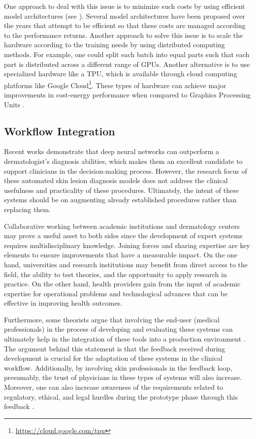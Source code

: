     One approach to deal with this issue is to minimize such costs by using efficient model architectures (see ). Several model architectures have been proposed over the years that attempt to be efficient so that these costs are managed according to the performance returns. Another approach to solve this issue is to scale the hardware according to the training needs by using distributed computing methods. For example, one could split each batch into equal parts such that each part is distributed across a different range of \ac{GPU}s. Another alternative is to use specialized hardware like a \ac{TPU}, which is available through cloud computing platforms like Google Cloud\footnote{\url{https://cloud.google.com/tpu}}. These types of hardware can achieve major improvements in cost-energy performance when compared to Graphics Processing Units \cite{Alom2019}. \par
    
    \subsection{Workflow Integration}
    Recent works \cite{Haenssle2018}\cite{Esteva2017}\cite{humanvsisic2018} demonstrate that deep neural networks can outperform a dermatologist's diagnosis abilities, which makes them an excellent candidate to support clinicians in the decision-making process. However, the research focus of these automated skin lesion diagnosis models does not address the clinical usefulness and practicality of these procedures. Ultimately, the intent of these systems should be on augmenting already established procedures rather than replacing them. \par 
    
    Collaborative working between academic institutions and dermatology centers may prove a useful asset to both sides since the development of expert systems requires multidisciplinary knowledge. Joining forces and sharing expertise are key elements to ensure improvements that have a measurable impact. On the one hand, universities and research institutions may benefit from direct access to the field, the ability to test theories, and the opportunity to apply research in practice. On the other hand, health providers gain from the input of academic expertise for operational problems and technological advances that can be effective in improving health outcomes. \par
    
    Furthermore, some theorists argue that involving the end-user (medical professionals) in the process of developing and evaluating these systems can ultimately help in the integration of these tools into a production environment \cite{Ching2018}. The argument behind this statement is that the feedback received during development is crucial for the adaptation of these systems in the clinical workflow. Additionally, by involving skin professionals in the feedback loop, presumably, the trust of physicians in these types of systems will also increase. Moreover, one can also increase awareness of the requirements related to regulatory, ethical, and legal hurdles during the prototype phase through this feedback \cite{Ching2018}. \par